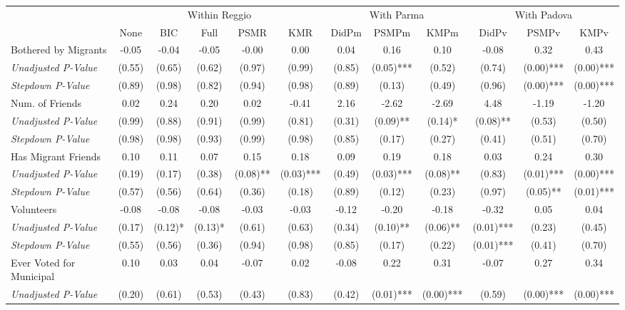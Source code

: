 \begin{tabular}{l c c c c c c c c c c c}
\toprule
& \multicolumn{5}{c}{Within Reggio} & \multicolumn{3}{c}{With Parma} & \multicolumn{3}{c}{With Padova} \\\cmidrule(lr){2-6} \cmidrule(lr){7-9} \cmidrule(lr){10-12}
 & None & BIC & Full & PSMR & KMR & DidPm & PSMPm & KMPm & DidPv & PSMPv & KMPv \\
\midrule
Bothered by Migrants & -0.05 & -0.04 & -0.05 & -0.00 & 0.00 & 0.04 & 0.16 & 0.10 & -0.08 & 0.32 & 0.43 \\
\quad \textit{Unadjusted P-Value} & (0.55) & (0.65) & (0.62) & (0.97) & (0.99) & (0.85) & (0.05)*** & (0.52) & (0.74) & (0.00)*** & (0.00)*** \\
\quad \textit{Stepdown P-Value} & (0.89) & (0.98) & (0.82) & (0.94) & (0.98) & (0.89) & (0.13) & (0.49) & (0.96) & (0.00)*** & (0.00)*** \\
Num. of Friends & 0.02 & 0.24 & 0.20 & 0.02 & -0.41 & 2.16 & -2.62 & -2.69 & 4.48 & -1.19 & -1.20 \\
\quad \textit{Unadjusted P-Value} & (0.99) & (0.88) & (0.91) & (0.99) & (0.81) & (0.31) & (0.09)** & (0.14)* & (0.08)** & (0.53) & (0.50) \\
\quad \textit{Stepdown P-Value} & (0.98) & (0.98) & (0.93) & (0.99) & (0.98) & (0.85) & (0.17) & (0.27) & (0.41) & (0.51) & (0.70) \\
Has Migrant Friends & 0.10 & 0.11 & 0.07 & 0.15 & 0.18 & 0.09 & 0.19 & 0.18 & 0.03 & 0.24 & 0.30 \\
\quad \textit{Unadjusted P-Value} & (0.19) & (0.17) & (0.38) & (0.08)** & (0.03)*** & (0.49) & (0.03)*** & (0.08)** & (0.83) & (0.01)*** & (0.00)*** \\
\quad \textit{Stepdown P-Value} & (0.57) & (0.56) & (0.64) & (0.36) & (0.18) & (0.89) & (0.12) & (0.23) & (0.97) & (0.05)** & (0.01)*** \\
Volunteers & -0.08 & -0.08 & -0.08 & -0.03 & -0.03 & -0.12 & -0.20 & -0.18 & -0.32 & 0.05 & 0.04 \\
\quad \textit{Unadjusted P-Value} & (0.17) & (0.12)* & (0.13)* & (0.61) & (0.63) & (0.34) & (0.10)** & (0.06)** & (0.01)*** & (0.23) & (0.45) \\
\quad \textit{Stepdown P-Value} & (0.55) & (0.56) & (0.36) & (0.94) & (0.98) & (0.85) & (0.17) & (0.22) & (0.01)*** & (0.41) & (0.70) \\
Ever Voted for Municipal & 0.10 & 0.03 & 0.04 & -0.07 & 0.02 & -0.08 & 0.22 & 0.31 & -0.07 & 0.27 & 0.34 \\
\quad \textit{Unadjusted P-Value} & (0.20) & (0.61) & (0.53) & (0.43) & (0.83) & (0.42) & (0.01)*** & (0.00)*** & (0.59) & (0.00)*** & (0.00)*** \\

\end{tabular}
